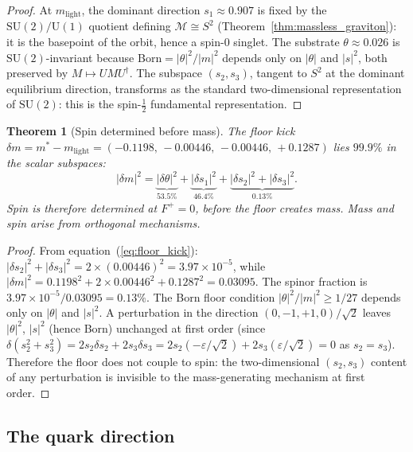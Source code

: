 \documentclass[11pt,a4paper]{article}
\newtheorem{theorem}{Theorem}[section]
\theoremstyle{definition}
\theoremstyle{remark}
\newcommand{\SU}{\mathrm{SU}}
\begin{document}
\begin{proof}
At $m_\mathrm{light}$, the dominant direction $s_1\approx 0.907$ is fixed by the $\SU(2)/\mathrm{U}(1)$ quotient defining $\mathcal{M}\cong S^2$ (Theorem~\ref{thm:massless_graviton}): it is the basepoint of the orbit, hence a spin-$0$ singlet. The substrate $\theta\approx 0.026$ is $\SU(2)$-invariant because Born$=|\theta|^2/|m|^2$ depends only on $|\theta|$ and $|s|^2$, both preserved by $M\mapsto UMU^\dagger$. The subspace $(s_2,s_3)$, tangent to $S^2$ at the dominant equilibrium direction, transforms as the standard two-dimensional representation of $\SU(2)$: this is the spin-$\tfrac{1}{2}$ fundamental representation.
\end{proof}

\begin{theorem}[Spin determined before mass]\label{thm:spin_before_mass}
The floor kick $\delta m=m^*-m_\mathrm{light}=(-0.1198,\,-0.00446,\,-0.00446,\,+0.1287)$ lies $99.9\%$ in the scalar subspaces:
\begin{equation}\label{eq:kick_decomp}
|\delta m|^2 = \underbrace{|\delta\theta|^2}_{53.5\%} + \underbrace{|\delta s_1|^2}_{46.4\%} + \underbrace{|\delta s_2|^2+|\delta s_3|^2}_{0.13\%}.
\end{equation}
Spin is therefore determined at $F^+=0$, before the floor creates mass. Mass and spin arise from orthogonal mechanisms.
\end{theorem}

\begin{proof}
From equation~(\ref{eq:floor_kick}): $|\delta s_2|^2+|\delta s_3|^2=2\times(0.00446)^2=3.97\times 10^{-5}$, while $|\delta m|^2=0.1198^2+2\times 0.00446^2+0.1287^2=0.03095$. The spinor fraction is $3.97\times 10^{-5}/0.03095=0.13\%$. The Born floor condition $|\theta|^2/|m|^2\geq 1/27$ depends only on $|\theta|$ and $|s|^2$. A perturbation in the direction $(0,-1,+1,0)/\sqrt{2}$ leaves $|\theta|^2$, $|s|^2$ (hence Born) unchanged at first order (since $\delta(s_2^2+s_3^2)=2s_2\delta s_2+2s_3\delta s_3=2s_2(-\varepsilon/\sqrt{2})+2s_3(\varepsilon/\sqrt{2})=0$ as $s_2=s_3$). Therefore the floor does not couple to spin: the two-dimensional $(s_2,s_3)$ content of any perturbation is invisible to the mass-generating mechanism at first order.
\end{proof}

\subsection{The quark direction}\label{sec:quark_direction}
\end{document}
